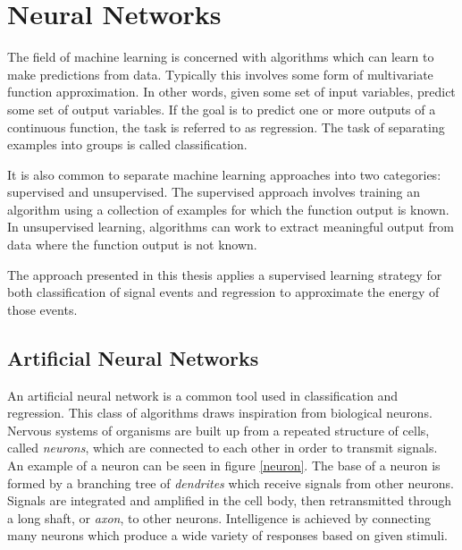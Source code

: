 \chapter{Neural Networks}
\label{nnet_chapter}

The field of machine learning is concerned with algorithms which can learn to make predictions from data.  Typically this involves some form of multivariate function approximation.  In other words, given some set of input variables, predict some set of output variables.  If the goal is to predict one or more outputs of a continuous function, the task is referred to as regression.  The task of separating examples into groups is called classification.


It is also common to separate machine learning approaches into two categories: supervised and unsupervised.  The supervised approach involves training an algorithm using a collection of examples for which the function output is known.  In unsupervised learning, algorithms can work to extract meaningful output from data where the function output is not known.

The approach presented in this thesis applies a supervised learning strategy for both classification of signal events and regression to approximate the energy of those events.



\section{Artificial Neural Networks}

An artificial neural network is a common tool used in classification and regression.  This class of algorithms draws inspiration from biological neurons.  Nervous systems of organisms are built up from a repeated structure of cells, called \textit{neurons}, which are connected to each other in order to transmit signals.  An example of a neuron can be seen in figure \ref{neuron}.  The base of a neuron is formed by a branching tree of \textit{dendrites} which receive signals from other neurons.  Signals are integrated and amplified in the cell body, then retransmitted through a long shaft, or \textit{axon}, to other neurons.  Intelligence is achieved by connecting many neurons which produce a wide variety of responses based on given stimuli.


